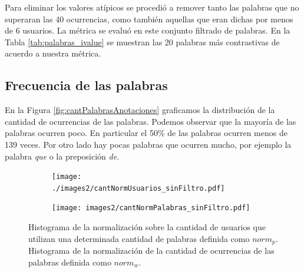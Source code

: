 Para eliminar los valores atípicos se procedió a remover tanto las palabras que no superaran las 40 ocurrencias, como también aquellas que eran dichas por menos de 6 usuarios. La métrica se evaluó en este conjunto filtrado de palabras. En la Tabla \ref{tab:palabras_ivalue} se muestran las 20 palabras más contrastivas de acuerdo a nuestra métrica.

\subsection{Frecuencia de las palabras}
\label{sub: frecuenciaPalabras}
En la Figura \ref{fig:cantPalabrasAnotaciones} graficamos la distribución de la cantidad de ocurrencias de las palabras. Podemos observar que la mayoría de las palabras ocurren poco. En particular el 50\% de las palabras ocurren menos de 139 veces. Por otro lado hay pocas palabras que ocurren mucho, por ejemplo la palabra \textit{que} o la preposición \textit{de}.


\begin{figure}[!ht]\centering
  \begin{subfigure}[t]{0.49\textwidth}
    \texttt{[image: ./images2/cantNormUsuarios\_sinFiltro.pdf]}
    \caption{} 
    \label{fig:cantNormUsuarios} 
   \end{subfigure}
   \begin{subfigure}[t]{0.49\textwidth}
    \texttt{[image: images2/cantNormPalabras\_sinFiltro.pdf]}
    \caption{} 
    \label{fig:cantNormPalabras} 
   \end{subfigure}
   \caption{ Histograma de la normalización sobre la cantidad de usuarios que utilizan una determinada cantidad de palabras definida como $norm_p$.  Histograma de la normalización de la cantidad de ocurrencias de las palabras definida como $norm_w$.}
   \label{fig:cantNormFig}
\end{figure}


